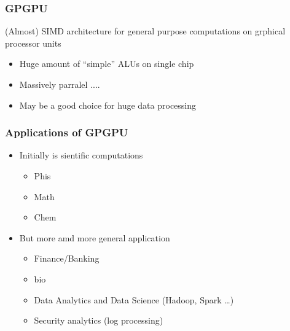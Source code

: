 \documentclass[xcolor=table]{beamer}
\begin{document}
\begin{frame}[fragile]
  \transwipe[direction=90]
  \frametitle{GPGPU}
  \begin{minipage}[m]{0.40\linewidth}
\end{minipage}\hfill
\begin{minipage}[m]{0.6\linewidth}
(Almost) SIMD architecture for general purpose computations on grphical processor units
\begin{itemize}
      \item Huge amount of ``simple'' ALUs on single chip
      \item Massively parralel ....
      \item May be a good choice for huge data processing
\end{itemize}

\end{minipage}

\end{frame}

\begin{frame}[fragile]
  \transwipe[direction=90]
  \frametitle{Applications of GPGPU}
  \begin{itemize}
    \item Initially is sientific computations
    \begin{itemize}
      \item Phis
      \item Math
      \item Chem
    \end{itemize}
    \item But more amd more general application
      \begin{itemize} 
        \item Finance/Banking
        \item bio
        \item Data    Analytics   and Data    Science (Hadoop,    Spark   …)
        \item Security  analytics   (log    processing)
      \end{itemize}
  \end{itemize}
\end{frame}
\end{document}
